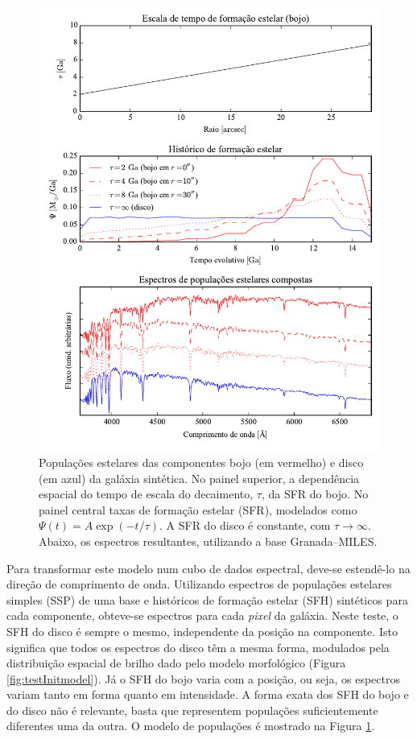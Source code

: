 \begin{figure}
	\includegraphics{figuras/simulation_popmodel}
	\caption[Modelos de populações estelares da galáxia sintética.]
	{Populações estelares das componentes bojo (em vermelho)
	e disco (em azul) da galáxia sintética. No painel superior, a dependência
	espacial do tempo de escala do decaimento, $\tau$, da SFR do bojo. No painel
	central taxas de formação estelar (SFR), modelados como $\Psi(t) = A \exp
	(-t/\tau)$. A SFR do disco é constante, com $\tau\to\infty$. Abaixo, os
	espectros resultantes, utilizando a base Granada--MILES.}
	\label{fig:testPopmodel}
\end{figure}

Para transformar este modelo num cubo de dados espectral, deve-se estendê-lo na
direção de comprimento de onda. Utilizando espectros de populações estelares
simples (SSP) de uma base e históricos de formação estelar (SFH) sintéticos
para cada componente, obteve-se espectros para cada {\em pixel} da galáxia. Neste
teste, o SFH do disco é sempre o mesmo, independente da posição na componente.
Isto significa que todos os espectros do disco têm a mesma forma, modulados pela
distribuição espacial de brilho dado pelo modelo morfológico (Figura
\ref{fig:testInitmodel}). Já o SFH do bojo varia com a posição, ou seja, os
espectros variam tanto em forma quanto em intensidade. A forma exata dos SFH do
bojo e do disco não é relevante, basta que representem populações
suficientemente diferentes uma da outra. O modelo de populações é mostrado na
Figura \ref{fig:testPopmodel}.

